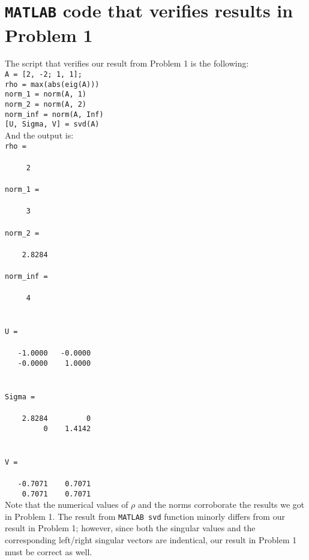 \documentclass[11pt]{article}
\begin{document}
\section{\texttt{MATLAB} code that verifies results in Problem 1}
The script that verifies our result from Problem 1 is the following:\\[0.4cm]
\texttt{A = {[2, -2; 1, 1]};\\
rho = max(abs(eig(A)))\\
norm\_1 = norm(A, 1)\\
norm\_2 = norm(A, 2)\\
norm\_inf = norm(A, Inf)\\
{[U, Sigma, V]} = svd(A)}\\[0.4cm]
And the output is:\\
\texttt{rho =\\
\\
\ \ \ \ \ 2
\\
\\
norm\_1 =\\
\\
\ \ \ \ \ 3
\\
\\
norm\_2 =\\
\\
\ \ \ \ 2.8284
\\
\\
norm\_inf =\\
\\
\ \ \ \ \ 4\\
\\
\\
U =\\
\\
\ \ \ -1.0000\ \ \ -0.0000\\
\ \ \ -0.0000\ \ \ \ 1.0000\\
\\
\\
Sigma =\\
\\
\ \ \ \ 2.8284\ \ \ \ \ \ \ \ \ 0\\
\ \ \ \ \ \ \ \ \ 0\ \ \ \ 1.4142\\
\\
\\
V =\\
\\
\ \ \ -0.7071\ \ \ \ 0.7071\\
\ \ \ \ 0.7071\ \ \ \ 0.7071}\\[0.4cm]
Note that the numerical values of $\rho$ and the norms corroborate the results we got in Problem 1. The result from \texttt{MATLAB svd} function minorly differs from our result in Problem 1; however, since both the singular values and the corresponding left/right singular vectors are indentical, our result in Problem 1 must be correct as well.
\end{document}
